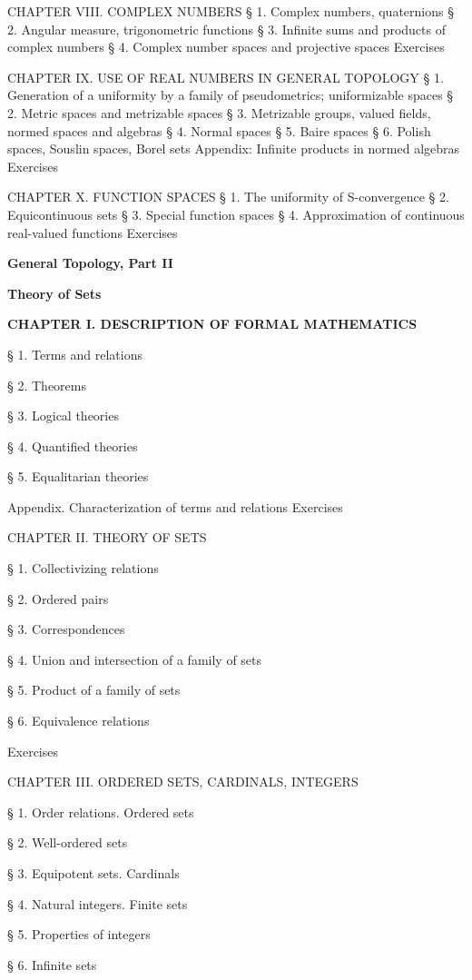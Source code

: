 CHAPTER VIII. COMPLEX NUMBERS § 1. Complex numbers, quaternions § 2. Angular measure, trigonometric functions § 3. Infinite sums and products of complex numbers § 4. Complex number spaces and projective spaces Exercises

CHAPTER IX. USE OF REAL NUMBERS IN GENERAL TOPOLOGY § 1. Generation of a uniformity by a family of pseudometrics; uniformizable spaces § 2. Metric spaces and metrizable spaces § 3. Metrizable groups, valued fields, normed spaces and algebras § 4. Normal spaces § 5. Baire spaces § 6. Polish spaces, Souslin spaces, Borel sets Appendix: Infinite products in normed algebras Exercises

CHAPTER X. FUNCTION SPACES § 1. The uniformity of S-convergence § 2. Equicontinuous sets § 3. Special function spaces § 4. Approximation of continuous real-valued functions Exercises

\textbf{General Topology, Part II}

\textbf{Theory of Sets}

\textbf{CHAPTER I. DESCRIPTION OF FORMAL MATHEMATICS}

§ 1. Terms and relations

§ 2. Theorems

§ 3. Logical theories

§ 4. Quantified theories

§ 5. Equalitarian theories

Appendix. Characterization of terms and relations Exercises

CHAPTER II. THEORY OF SETS

§ 1. Collectivizing relations

§ 2. Ordered pairs

§ 3. Correspondences

§ 4. Union and intersection of a family of sets

§ 5. Product of a family of sets

§ 6. Equivalence relations

Exercises

CHAPTER III. ORDERED SETS, CARDINALS, INTEGERS

§ 1. Order relations. Ordered sets

§ 2. Well-ordered sets

§ 3. Equipotent sets. Cardinals

§ 4. Natural integers. Finite sets

§ 5. Properties of integers

§ 6. Infinite sets

